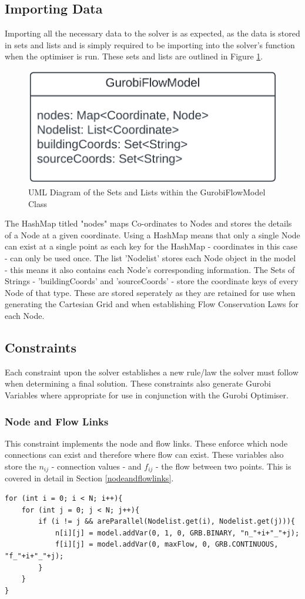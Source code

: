 \subsection{Importing Data}
Importing all the necessary data to the solver is as expected, as the data is stored in sets and lists and is simply required to be importing into the solver's function when the optimiser is run. These sets and lists are outlined in Figure \ref{fig:setsandlists_uml}.
\begin{figure}[H]
    \centering
    \includegraphics[width=0.4\linewidth]{nodeslistdiagram.png}
    \caption{UML Diagram of the Sets and Lists within the GurobiFlowModel Class}
    \label{fig:setsandlists_uml}
\end{figure}
The HashMap titled "nodes" maps Co-ordinates to Nodes and stores the details of a Node at a given coordinate. Using a HashMap means that only a single Node can exist at a single point as each key for the HashMap - coordinates in this case - can only be used once. The list 'Nodelist' stores each Node object in the model - this means it also contains each Node's corresponding information. The Sets of Strings - 'buildingCoords' and 'sourceCoords' - store the coordinate keys of every Node of that type. These are stored seperately as they are retained for use when generating the Cartesian Grid and when establishing Flow Conservation Laws for each Node.


\subsection{Constraints}\label{constraints}
Each constraint upon the solver establishes a new rule/law the solver must follow when determining a final solution. These constraints also generate Gurobi Variables where appropriate for use in conjunction with the Gurobi Optimiser.

\subsubsection{Node and Flow Links}
This constraint implements the node and flow links. These enforce which node connections can exist and therefore where flow can exist. These variables also store the $n_{ij}$ - connection values - and $f_{ij}$ - the flow between two points. This is covered in detail in Section \ref{nodeandflowlinks}.
\begin{lstlisting}
for (int i = 0; i < N; i++){
    for (int j = 0; j < N; j++){
        if (i != j && areParallel(Nodelist.get(i), Nodelist.get(j))){
            n[i][j] = model.addVar(0, 1, 0, GRB.BINARY, "n_"+i+"_"+j);
            f[i][j] = model.addVar(0, maxFlow, 0, GRB.CONTINUOUS, "f_"+i+"_"+j);
        }
    }
}
\end{lstlisting}

